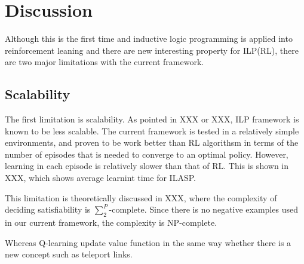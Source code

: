 



\section{Discussion}
\label{sec:discussion}

Although this is the first time and inductive logic programming is applied into reinforcement leaning and there are new interesting property for ILP(RL),
there are two major limitations with the current framework.

\subsection{Scalability}
\label{sec:scalability}

The first limitation is scalability. As pointed in XXX or XXX,
ILP framework is known to be less scalable. The current framework is tested in a relatively simple environments, 
and proven to be work better than RL algorithsm in terms of the number of episodes that is needed to converge to an optimal policy.
However, learning in each episode is relatively slower than that of RL. 
This is shown in XXX, which shows average learnint time for ILASP. 

This limitation is theoretically discussed in XXX, where the complexity of deciding satisfiability is 
$\sum_{2}^{P}$-complete. Since there is no negative examples used in our current framework, the complexity is NP-complete.

Whereas Q-learning update value function in the same way whether there is a new concept such as teleport links.

